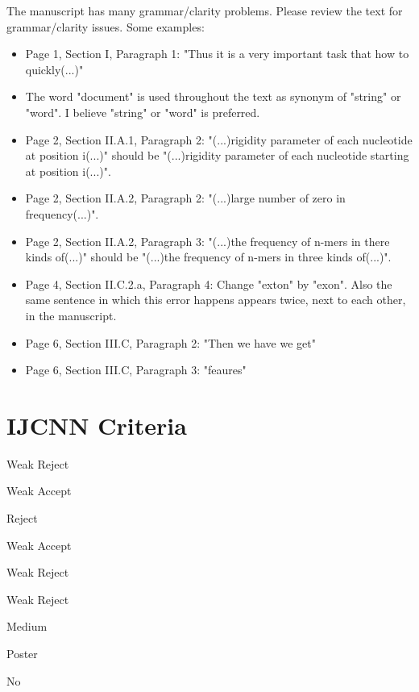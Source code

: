 \documentclass[11pt]{article}
\begin{document}
 The manuscript has many grammar/clarity problems. Please review the text for grammar/clarity issues. Some examples:
\begin{itemize}
  \item Page 1, Section I, Paragraph 1: "Thus it is a very important task that how to quickly(...)"
  \item The word "document" is used throughout the text as synonym of "string" or "word". I believe "string" or "word" is preferred.
  \item Page 2, Section II.A.1, Paragraph 2: "(...)rigidity parameter of each nucleotide at position i(...)" should be "(...)rigidity parameter of each nucleotide starting at position i(...)".
  \item Page 2, Section II.A.2, Paragraph 2: "(...)large number of zero in frequency(...)".
  \item Page 2, Section II.A.2, Paragraph 3: "(...)the frequency of n-mers in there kinds of(...)" should be "(...)the frequency of n-mers in three kinds of(...)".
  \item Page 4, Section II.C.2.a, Paragraph 4: Change "exton" by "exon". Also the same sentence in which this error happens appears twice, next to each other, in the manuscript.
  \item Page 6, Section III.C, Paragraph 2: "Then we have we get"
  \item Page 6, Section III.C, Paragraph 3: "feaures"
\end{itemize}

\section{IJCNN Criteria}


 Weak Reject

 Weak Accept

 Reject

 Weak Accept

 Weak Reject

 Weak Reject

 Medium

 Poster

 No



\end{document}
